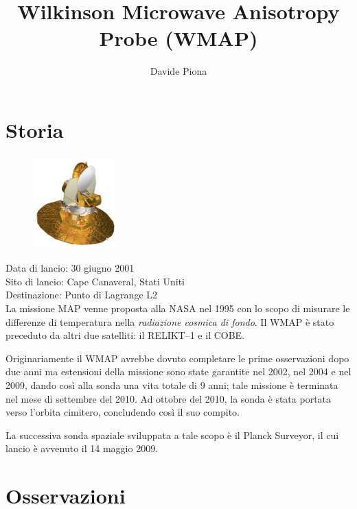 \documentclass[12pt,a4paper]{article}
\begin{document}
\title{\vspace{-70pt}Wilkinson Microwave Anisotropy Probe (WMAP)}
\author{Davide Piona}
\date{}
\maketitle
\pagestyle{empty}
\thispagestyle{empty}

\section*{Storia}
\label{storia}
\begin{figure}
  \vspace{-10pt}
  \begin{center}
    \includegraphics[width=0.30\textwidth]{satellite}
  \end{center}
  \vspace{-20pt}
\end{figure}

Data di lancio: 30 giugno 2001\\
Sito di lancio: Cape Canaveral, Stati Uniti\\
Destinazione: Punto di Lagrange L2\\

La missione MAP venne proposta alla NASA nel 1995 con lo scopo di misurare le differenze di temperatura nella \emph{radiazione cosmica di fondo}. Il WMAP è stato preceduto da altri due satelliti: il RELIKT--1 e il COBE. 

Originariamente il WMAP avrebbe dovuto completare le prime osservazioni dopo due anni ma estensioni della missione sono state garantite nel 2002, nel 2004 e nel 2009, dando così alla sonda una vita totale di 9 anni; tale missione è terminata nel mese di settembre del 2010. Ad ottobre del 2010, la sonda è stata portata verso l'orbita cimitero, concludendo così il suo compito.

La successiva sonda spaziale sviluppata a tale scopo è il Planck Surveyor, il cui lancio è avvenuto il 14 maggio 2009.

\section{Osservazioni}
\label{osservazioni}
\end{document}
